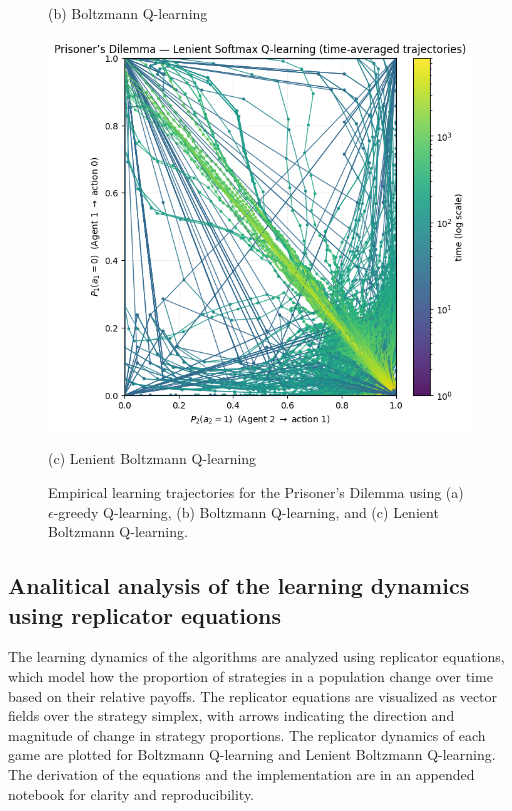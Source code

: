 \begin{figure}[h]
\begin{minipage}{0.32\textwidth}
        \caption*{(b) Boltzmann Q-learning}
    \end{minipage}
    \hfill
    \begin{minipage}{0.32\textwidth}
        \centering
        \includegraphics[width=\linewidth]{figures/task-2/learning/pd_lenient.png}
        \caption*{(c) Lenient Boltzmann Q-learning}
    \end{minipage}
    \caption{Empirical learning trajectories for the Prisoner's Dilemma using (a) $\epsilon$-greedy Q-learning, (b) Boltzmann Q-learning, and (c) Lenient Boltzmann Q-learning.}
\end{figure}



\subsection{Analitical analysis of the learning dynamics using replicator equations}
The learning dynamics of the algorithms are analyzed using replicator equations, which model how the proportion of strategies in a population change over time based on their relative payoffs. The replicator equations are visualized as vector fields over the strategy simplex, with arrows indicating the direction and magnitude of change in strategy proportions. The replicator dynamics of each game are plotted for Boltzmann Q-learning and Lenient Boltzmann Q-learning. The derivation of the equations and the implementation are in an appended notebook for clarity and reproducibility.

